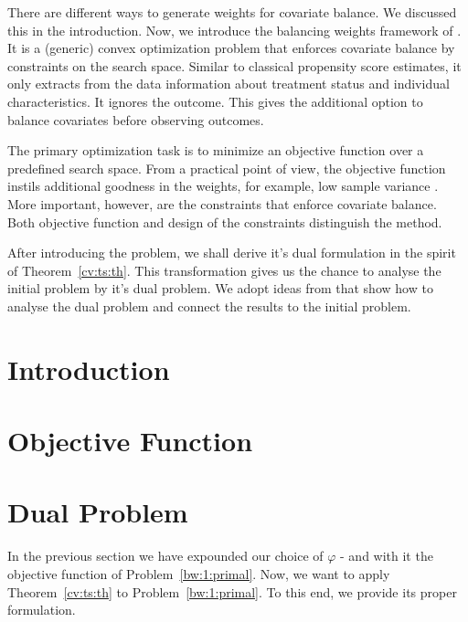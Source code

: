 There are different ways
to generate weights for covariate balance.
%
We discussed this in the introduction.
%
Now, we introduce the balancing weights framework of \cite{Wang2019}.
%
It is a (generic) convex optimization problem
that enforces covariate balance by constraints on the search space.
%
Similar to classical propensity score estimates, it only
extracts from the data information about treatment status and individual characteristics.
%
It ignores the outcome.
%
This gives the additional option to balance covariates before observing outcomes.

%
The primary optimization task is to minimize an objective function
over a predefined search space.
%
From a practical point of view, the objective function
instils additional goodness in the weights, 
for example, 
low sample variance \cite[Introduction]{Zubizarreta2015}. 
%
%
More important, however, are the constraints that enforce covariate balance.
%
Both objective function and design of the constraints distinguish the method.
%

After introducing the problem, we shall derive it's dual formulation in the spirit of Theorem~\ref{cv:ts:th}.
This transformation gives us the chance to analyse the initial problem by it's dual problem.
We adopt ideas from \cite{Wang2019} that show how to analyse the dual problem and connect the results to the initial problem.
\section{Introduction}


\section{Objective Function}

\section{Dual Problem}
In the previous section we have expounded our choice of $\varphi$ - and with it the objective function of Problem~\ref{bw:1:primal}.
%
Now, we want to apply Theorem~\ref{cv:ts:th} to Problem~\ref{bw:1:primal}.
%
To this end, we provide its proper formulation.
%




%
%

